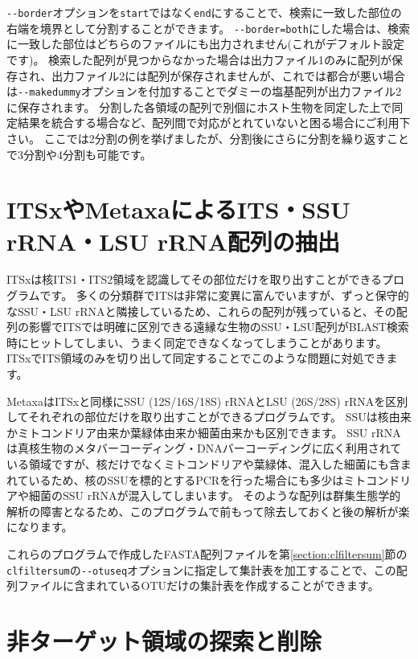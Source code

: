 \documentclass[titlepage,10pt,a4paper]{jsbook}
\begin{document}
\texttt{{-}{-}border}オプションを\texttt{start}ではなく\texttt{end}にすることで、検索に一致した部位の右端を境界として分割することができます。
\texttt{{-}{-}border=both}にした場合は、検索に一致した部位はどちらのファイルにも出力されません(これがデフォルト設定です)。
検索した配列が見つからなかった場合は出力ファイル1のみに配列が保存され、出力ファイル2には配列が保存されませんが、これでは都合が悪い場合は\texttt{{-}{-}makedummy}オプションを付加することでダミーの塩基配列が出力ファイル2に保存されます。
分割した各領域の配列で別個にホスト生物を同定した上で同定結果を統合する場合など、配列間で対応がとれていないと困る場合にご利用下さい。
ここでは2分割の例を挙げましたが、分割後にさらに分割を繰り返すことで3分割や4分割も可能です。

\section{ITSxやMetaxaによるITS・SSU rRNA・LSU rRNA配列の抽出}

ITSxは核ITS1・ITS2領域を認識してその部位だけを取り出すことができるプログラムです\citep{Bengtsson2013}。
多くの分類群でITSは非常に変異に富んでいますが、ずっと保守的なSSU・LSU rRNAと隣接しているため、これらの配列が残っていると、その配列の影響でITSでは明確に区別できる遠縁な生物のSSU・LSU配列がBLAST検索時にヒットしてしまい、うまく同定できなくなってしまうことがあります。
ITSxでITS領域のみを切り出して同定することでこのような問題に対処できます。

MetaxaはITSxと同様にSSU (12S/16S/18S) rRNAとLSU (26S/28S) rRNAを区別してそれぞれの部位だけを取り出すことができるプログラムです\citep{Bengtsson2011}。
SSUは核由来かミトコンドリア由来か葉緑体由来か細菌由来かも区別できます。
SSU rRNAは真核生物のメタバーコーディング・DNAバーコーディングに広く利用されている領域ですが、核だけでなくミトコンドリアや葉緑体、混入した細菌にも含まれているため、核のSSUを標的とするPCRを行った場合にも多少はミトコンドリアや細菌のSSU rRNAが混入してしまいます。
そのような配列は群集生態学的解析の障害となるため、このプログラムで前もって除去しておくと後の解析が楽になります。

これらのプログラムで作成したFASTA配列ファイルを第\ref{section:clfiltersum}節の\texttt{clfiltersum}の\texttt{{-}{-}otuseq}オプションに指定して集計表を加工することで、この配列ファイルに含まれているOTUだけの集計表を作成することができます。

\section{非ターゲット領域の探索と削除}
\end{document}
